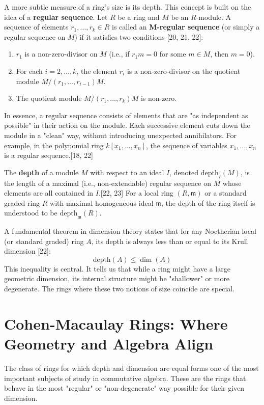 \documentclass[11pt]{article}
\begin{document}
A more subtle measure of a ring's size is its depth. This concept is built on the idea of a \textbf{regular sequence}. Let $R$ be a ring and $M$ be an $R$-module. A sequence of elements $r_1, \ldots, r_k \in R$ is called an \textbf{M-regular sequence} (or simply a regular sequence on $M$) if it satisfies two conditions [20, 21, 22]:
\begin{enumerate}
    \item $r_1$ is a non-zero-divisor on $M$ (i.e., if $r_1 m = 0$ for some $m \in M$, then $m=0$).
    \item For each $i = 2, \ldots, k$, the element $r_i$ is a non-zero-divisor on the quotient module $M/(r_1, \ldots, r_{i-1})M$.
    \item The quotient module $M/(r_1, \ldots, r_k)M$ is non-zero.
\end{enumerate}

In essence, a regular sequence consists of elements that are "as independent as possible" in their action on the module. Each successive element cuts down the module in a "clean" way, without introducing unexpected annihilators. For example, in the polynomial ring $k[x_1, \ldots, x_n]$, the sequence of variables $x_1, \ldots, x_n$ is a regular sequence.[18, 22]

The \textbf{depth} of a module $M$ with respect to an ideal $I$, denoted $\text{depth}_I(M)$, is the length of a maximal (i.e., non-extendable) regular sequence on $M$ whose elements are all contained in $I$.[22, 23] For a local ring $(R, \mathfrak{m})$ or a standard graded ring $R$ with maximal homogeneous ideal $\mathfrak{m}$, the depth of the ring itself is understood to be $\text{depth}_\mathfrak{m}(R)$.

A fundamental theorem in dimension theory states that for any Noetherian local (or standard graded) ring $A$, its depth is always less than or equal to its Krull dimension [22]:
\[\text{depth}(A) \le \dim(A)\]
This inequality is central. It tells us that while a ring might have a large geometric dimension, its internal structure might be "shallower" or more degenerate. The rings where these two notions of size coincide are special.

\section{Cohen-Macaulay Rings: Where Geometry and Algebra Align}

The class of rings for which depth and dimension are equal forms one of the most important subjects of study in commutative algebra. These are the rings that behave in the most "regular" or "non-degenerate" way possible for their given dimension.
\end{document}
